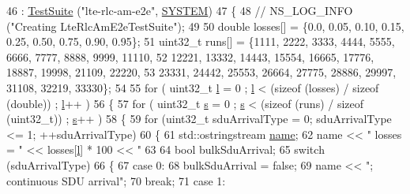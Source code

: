 \begin{DoxyCode}
46   : \hyperlink{classns3_1_1TestSuite_a904b0c40583b744d30908aeb94636d1a}{TestSuite} (\textcolor{stringliteral}{"lte-rlc-am-e2e"}, \hyperlink{classns3_1_1TestSuite_a1ebfcab34ec8161e085e8e3a1855eae0a90c5529a26ab3a5ffcc6e57040dbd82e}{SYSTEM})
47 \{
48   \textcolor{comment}{// NS\_LOG\_INFO ("Creating LteRlcAmE2eTestSuite");}
49 
50   \textcolor{keywordtype}{double} losses[] = \{0.0, 0.05,  0.10, 0.15, 0.25, 0.50, 0.75, 0.90, 0.95\};
51   uint32\_t runs[] = \{1111, 2222, 3333, 4444, 5555, 6666, 7777, 8888, 9999, 11110,
52                      12221, 13332, 14443, 15554, 16665, 17776, 18887, 19998, 21109, 22220,
53                      23331, 24442, 25553, 26664, 27775, 28886, 29997, 31108, 32219, 33330\};
54 
55   \textcolor{keywordflow}{for} ( uint32\_t \hyperlink{buildings__pathloss_8m_a5b54c0a045f179bcbbbc9abcb8b5cd4c}{l} = 0 ; \hyperlink{buildings__pathloss_8m_a5b54c0a045f179bcbbbc9abcb8b5cd4c}{l} < (\textcolor{keyword}{sizeof} (losses) / \textcolor{keyword}{sizeof} (\textcolor{keywordtype}{double})) ; \hyperlink{buildings__pathloss_8m_a5b54c0a045f179bcbbbc9abcb8b5cd4c}{l}++ )
56     \{
57       \textcolor{keywordflow}{for} ( uint32\_t \hyperlink{generate__test__data__lte__sinr_8m_ad83eeb3a142285d1243a08c6b7026df8}{s} = 0 ; \hyperlink{generate__test__data__lte__sinr_8m_ad83eeb3a142285d1243a08c6b7026df8}{s} < (\textcolor{keyword}{sizeof} (runs) / \textcolor{keyword}{sizeof} (uint32\_t)) ; \hyperlink{generate__test__data__lte__sinr_8m_ad83eeb3a142285d1243a08c6b7026df8}{s}++ )
58         \{
59           \textcolor{keywordflow}{for} (uint32\_t sduArrivalType = 0; sduArrivalType <= 1; ++sduArrivalType)
60             \{
61               std::ostringstream \hyperlink{generate__test__data__lte__spectrum__model_8m_ab74e6bf80237ddc4109968cedc58c151}{name};
62               name << \textcolor{stringliteral}{" losses = "} << losses[\hyperlink{buildings__pathloss_8m_a5b54c0a045f179bcbbbc9abcb8b5cd4c}{l}] * 100 << \textcolor{stringliteral}{"%
63               
64               \textcolor{keywordtype}{bool} bulkSduArrival;
65               \textcolor{keywordflow}{switch} (sduArrivalType)
66                 \{
67                 \textcolor{keywordflow}{case} 0:
68                   bulkSduArrival = \textcolor{keyword}{false};
69                   name << \textcolor{stringliteral}{"; continuous SDU arrival"};
70                   \textcolor{keywordflow}{break};
71                 \textcolor{keywordflow}{case} 1:
}
\end{DoxyCode}
